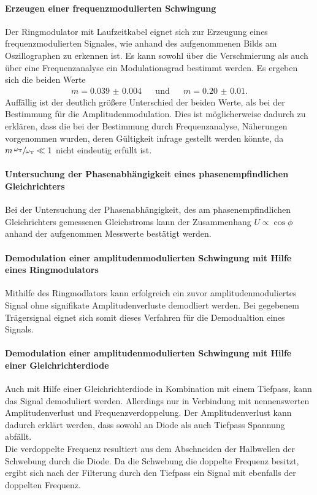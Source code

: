 \paragraph{Erzeugen einer frequenzmodulierten Schwingung}
Der Ringmodulator mit Laufzeitkabel eignet sich zur Erzeugung
eines frequenzmodulierten Signales, wie anhand des aufgenommenen Bilds
am Oszillographen zu erkennen ist.
Es kann sowohl über
die Verschmierung als auch über eine Frequenzanalyse
ein Modulationsgrad bestimmt werden.
Es ergeben sich die beiden Werte
\begin{align}
  m = \num{0.039(4)}& &\text{und}& &m=\num{0.20(1)}.

\end{align}
Auffällig ist der deutlich größere Unterschied der beiden Werte,
als bei der Bestimmung für die Amplitudenmodulation.
Dies ist möglicherweise dadurch zu erklären, dass
die bei der Bestimmung durch Frequenzanalyse, Näherungen vorgenommen
wurden, deren Gültigkeit infrage gestellt werden könnte, da
$m \, \sfrac{\omega_{\text{T}}}{\omega_{\text{T}}}\ll1$
nicht eindeutig erfüllt ist.

\paragraph{Untersuchung der Phasenabhängigkeit eines
phasenempfindlichen Gleichrichters}
Bei der Untersuchung der Phasenabhängigkeit, des am phasenempfindlichen
Gleichrichters gemessenen Gleichstroms kann der Zusammenhang $U \propto \cos \phi$ anhand der
aufgenommen Messwerte bestätigt werden.

\paragraph{Demodulation einer amplitudenmodulierten Schwingung
mit Hilfe eines Ringmodulators}
Mithilfe des Ringmodlators kann erfolgreich
ein zuvor amplitudenmoduliertes Signal ohne signifikate Amplitudenverluste
demodliert werden.
Bei gegebenem Trägersignal eignet sich somit dieses Verfahren für die
Demodualtion eines Signals.

\paragraph{Demodulation einer amplitudenmodulierten Schwingung
mit Hilfe einer Gleichrichterdiode}
Auch mit Hilfe einer Gleichrichterdiode in Kombination mit einem
Tiefpass, kann das Signal demoduliert werden.
Allerdings nur in Verbindung mit nennenswerten
Amplitudenverlust und Frequenzverdoppelung.
Der Amplitudenverlust kann dadurch erklärt werden, dass sowohl
an Diode als auch Tiefpass Spannung abfällt.\\
Die verdoppelte Frequenz resultiert aus dem Abschneiden
der Halbwellen der Schwebung durch die Diode.
Da die Schwebung die doppelte Frequenz besitzt, ergibt sich nach der Filterung 
durch den Tiefpass ein Signal mit ebenfalls der doppelten Frequenz.
